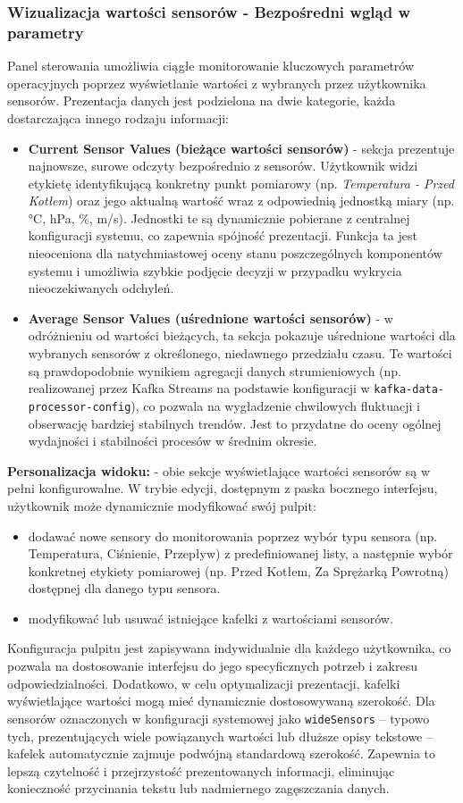 \subsubsection{Wizualizacja wartości sensorów - Bezpośredni wgląd w parametry}
Panel sterowania umożliwia ciągłe monitorowanie kluczowych parametrów operacyjnych poprzez wyświetlanie wartości z wybranych przez użytkownika sensorów. Prezentacja danych jest podzielona na dwie kategorie, każda dostarczająca innego rodzaju informacji:
\begin{itemize}
    \item \textbf{Current Sensor Values (bieżące wartości sensorów)} - sekcja prezentuje najnowsze, surowe odczyty bezpośrednio z sensorów. Użytkownik widzi etykietę identyfikującą konkretny punkt pomiarowy (np. \textit{Temperatura - Przed Kotłem}) oraz jego aktualną wartość wraz z odpowiednią jednostką miary (np. °C, hPa, \%, m/s). Jednostki te są dynamicznie pobierane z centralnej konfiguracji systemu, co zapewnia spójność prezentacji. Funkcja ta jest nieoceniona dla natychmiastowej oceny stanu poszczególnych komponentów systemu i umożliwia szybkie podjęcie decyzji w przypadku wykrycia nieoczekiwanych odchyleń.
    \item \textbf{Average Sensor Values (uśrednione wartości sensorów)} - w odróżnieniu od wartości bieżących, ta sekcja pokazuje uśrednione wartości dla wybranych sensorów z określonego, niedawnego przedziału czasu. Te wartości są prawdopodobnie wynikiem agregacji danych strumieniowych (np. realizowanej przez Kafka Streams na podstawie konfiguracji w \texttt{kafka-data-processor-config}), co pozwala na wygładzenie chwilowych fluktuacji i obserwację bardziej stabilnych trendów. Jest to przydatne do oceny ogólnej wydajności i stabilności procesów w średnim okresie.
\end{itemize}
\textbf{Personalizacja widoku:} - obie sekcje wyświetlające wartości sensorów są w pełni konfigurowalne. W trybie edycji, dostępnym z paska bocznego interfejsu, użytkownik może dynamicznie modyfikować swój pulpit:
\begin{itemize}
    \item dodawać nowe sensory do monitorowania poprzez wybór typu sensora (np. Temperatura, Ciśnienie, Przepływ) z predefiniowanej listy, a następnie wybór konkretnej etykiety pomiarowej (np. Przed Kotłem, Za Sprężarką Powrotną) dostępnej dla danego typu sensora.
    \item modyfikować lub usuwać istniejące kafelki z wartościami sensorów.
\end{itemize}
Konfiguracja pulpitu jest zapisywana indywidualnie dla każdego użytkownika, co pozwala na dostosowanie interfejsu do jego specyficznych potrzeb i zakresu odpowiedzialności. Dodatkowo, w celu optymalizacji prezentacji, kafelki wyświetlające wartości mogą mieć dynamicznie dostosowywaną szerokość. Dla sensorów oznaczonych w konfiguracji systemowej jako \texttt{wideSensors} – typowo tych, prezentujących wiele powiązanych wartości lub dłuższe opisy tekstowe – kafelek automatycznie zajmuje podwójną standardową szerokość. Zapewnia to lepszą czytelność i przejrzystość prezentowanych informacji, eliminując konieczność przycinania tekstu lub nadmiernego zagęszczania danych.


